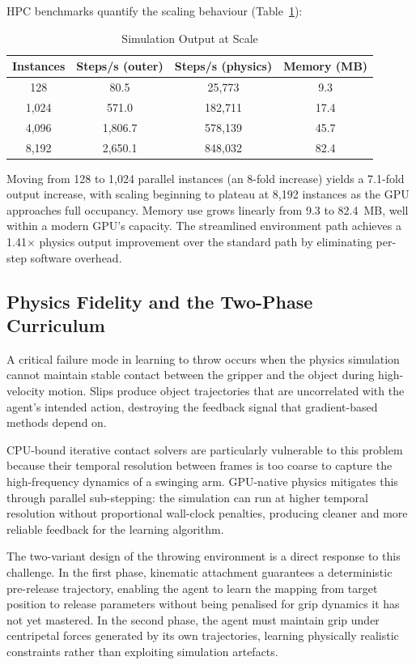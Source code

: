 \documentclass[11pt, a4paper]{article}
\begin{document}
HPC benchmarks quantify the scaling behaviour (Table~\ref{tab:scalability}):

\begin{table}[H]
\centering
\caption{Simulation Output at Scale}
\label{tab:scalability}
\begin{tabular}{@{} c c c c @{}}
\toprule
\textbf{Instances} & \textbf{Steps/s (outer)} & \textbf{Steps/s (physics)} & \textbf{Memory (MB)} \\
\midrule
128   & 80.5   & 25,773  & 9.3  \\
1,024 & 571.0  & 182,711 & 17.4 \\
4,096 & 1,806.7 & 578,139 & 45.7 \\
8,192 & 2,650.1 & 848,032 & 82.4 \\
\bottomrule
\end{tabular}
\end{table}

Moving from 128 to 1,024 parallel instances (an 8-fold increase) yields a 7.1-fold output increase, with scaling beginning to plateau at 8,192 instances as the GPU approaches full occupancy. Memory use grows linearly from 9.3 to 82.4~MB, well within a modern GPU's capacity. The streamlined environment path achieves a 1.41$\times$ physics output improvement over the standard path by eliminating per-step software overhead.

\subsection{Physics Fidelity and the Two-Phase Curriculum}

A critical failure mode in learning to throw occurs when the physics simulation cannot maintain stable contact between the gripper and the object during high-velocity motion. Slips produce object trajectories that are uncorrelated with the agent's intended action, destroying the feedback signal that gradient-based methods depend on.

CPU-bound iterative contact solvers are particularly vulnerable to this problem because their temporal resolution between frames is too coarse to capture the high-frequency dynamics of a swinging arm. GPU-native physics mitigates this through parallel sub-stepping: the simulation can run at higher temporal resolution without proportional wall-clock penalties, producing cleaner and more reliable feedback for the learning algorithm.

The two-variant design of the throwing environment is a direct response to this challenge. In the first phase, kinematic attachment guarantees a deterministic pre-release trajectory, enabling the agent to learn the mapping from target position to release parameters without being penalised for grip dynamics it has not yet mastered. In the second phase, the agent must maintain grip under centripetal forces generated by its own trajectories, learning physically realistic constraints rather than exploiting simulation artefacts.
\end{document}
